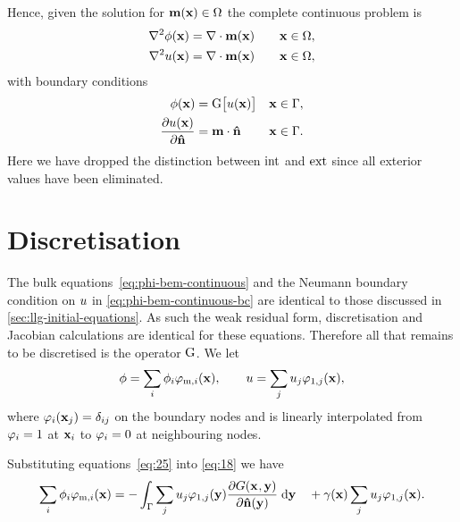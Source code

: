 Hence, given the solution for $\mathbf{m}(\mathbf{x}) \in \Omega$ the complete continuous problem is
\begin{equation}
  \begin{aligned}
    \nabla^2 \phi(\mathbf{x}) &= \nabla \cdot \mathbf{m}(\mathbf{x}) \quad & \mathbf{x} \in \Omega, \\
    \nabla^2 u(\mathbf{x}) &= \nabla \cdot \mathbf{m}(\mathbf{x})    & \mathbf{x} \in \Omega,
  \end{aligned}
  \label{eq:phi-bem-continuous}
\end{equation}
with boundary conditions
\begin{equation}
  \begin{aligned}
    \phi(\mathbf{x}) &= {\mathbf{\mathrm{G}}} \big[ u(\mathbf{x}) \big]      & \mathbf{x} \in {\Gamma}, \\
    \frac{\partial u(\mathbf{x})}{\partial \mathbf{\hat{n}}} &= \mathbf{m} \cdot \mathbf{\hat{n}}  & \mathbf{x} \in {\Gamma}.
    \label{eq:phi-bem-continuous-bc}
  \end{aligned}
\end{equation}
Here we have dropped the distinction between $\text{int}$ and $\text{ext}$ since all exterior values have been eliminated.


\section{Discretisation}
\label{sec:discretisation}

The bulk equations~\cref{eq:phi-bem-continuous} and the Neumann boundary condition on $u$ in \cref{eq:phi-bem-continuous-bc} are identical to those discussed in \cref{sec:llg-initial-equations}.
As such the weak residual form, discretisation and Jacobian calculations are identical for these equations.
Therefore all that remains to be discretised is the operator ${\mathbf{\mathrm{G}}}$.
We let
\begin{equation}
  \phi = \sum_{i} \phi_{{i}} \varphi_{\text{m},{i}}(\mathbf{x}),
  \qquad
  u = \sum_{j} u_{{j}} \varphi_{1,{j}}(\mathbf{x}),
  \label{eq:25}
\end{equation}
where $\varphi_{i}(\mathbf{x}_{j}) = \delta_{{i} {j}}$ on the boundary nodes and is linearly interpolated from $\varphi_{i} = 1$ at $\mathbf{x}_{i}$ to $\varphi_{i} = 0$ at neighbouring nodes.

Substituting equations~\cref{eq:25} into \cref{eq:18} we have
\begin{equation*}
  \sum_{i} \phi_{{i}} \varphi_{\text{m},{i}}(\mathbf{x}) =
  - \int_{{\Gamma}} \sum_{j} u_{{j}} \varphi_{1,{j}}(\mathbf{y})
  \frac{\partial G(\mathbf{x}_{},\mathbf{y})}{\partial \mathbf{\hat{n}}(\mathbf{y})} {\; \text{d}} \mathbf{y}
  \quad + \gamma(\mathbf{x}) \sum_{j} u_{{j}} \varphi_{1,{j}}(\mathbf{x}).
\end{equation*}

